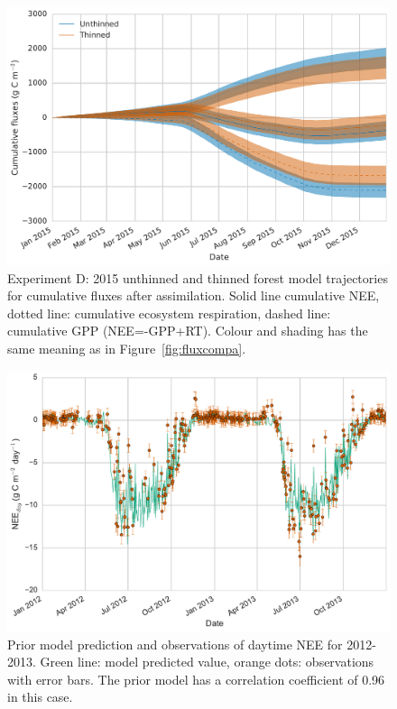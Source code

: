 \documentclass[draft,jgrga]{agutexSI}
\begin{document}
  \begin{figure}
 \noindent\includegraphics[width=40pc]{cum_fluxd.pdf}
\caption{Experiment D: 2015 unthinned and thinned forest model trajectories for cumulative fluxes after assimilation. Solid line cumulative NEE, dotted line: cumulative ecosystem respiration, dashed line: cumulative GPP (NEE=-GPP+RT). Colour and shading has the same meaning as in Figure~\ref{fig:fluxcompa}.}
 \label{fig:fluxcumd}
 \end{figure}
 
 
 \begin{figure}[ht]
 \noindent\includegraphics[width=40pc]{prior.pdf}
    \caption{Prior model prediction and observations of daytime NEE for 2012-2013. Green line: model predicted value, orange dots: observations with error bars. The prior model has a correlation coefficient of 0.96 in this case.} 
    \label{fig:prior_mod}
\end{figure}
\end{document}
